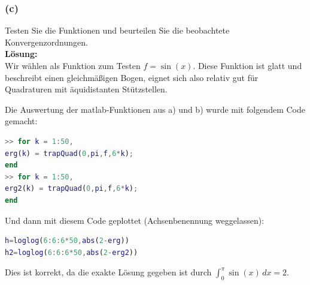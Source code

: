 \documentclass[11pt,a4paper,ngerman]{article}
\begin{document}
\subsubsection*{(c)}
Testen Sie die Funktionen und beurteilen Sie die beobachtete Konvergenzordnungen.\\

\textbf{Lösung:}\\
Wir wählen als Funktion zum Testen $f = \sin(x)$. Diese Funktion ist glatt und beschreibt einen
gleichmäßigen Bogen, eignet sich also relativ gut für Quadraturen mit äquidistanten Stützstellen.


Die Auswertung der matlab-Funktionen aus a) und b) wurde mit folgendem Code gemacht:
\begin{lstlisting}[language=matlab]
>> for k = 1:50,                         
erg(k) = trapQuad(0,pi,f,6*k);
end
>> for k = 1:50,              
erg2(k) = trapQuad(0,pi,f,6*k);
end
\end{lstlisting}

Und dann mit diesem Code geplottet (Achsenbenennung weggelassen):
\begin{lstlisting}[language=matlab]
h=loglog(6:6:6*50,abs(2-erg)) 
h2=loglog(6:6:6*50,abs(2-erg2)) 
\end{lstlisting}
Dies ist korrekt, da die exakte Lösung gegeben ist durch $\int_0^{\pi} \sin(x) \, dx = 2$.
\end{document}
